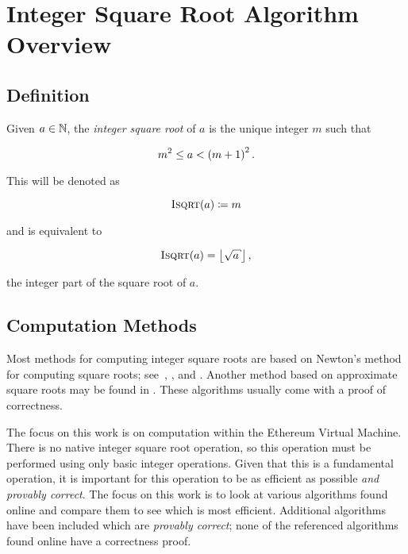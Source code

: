 \section{Integer Square Root Algorithm Overview}

\subsection{Definition}

Given $a\in\mathbb{N}$, the \emph{integer square root} of $a$
is the unique integer $m$ such that

\begin{equation}
    m^{2} \le a < \left( m+1 \right)^{2}.
\end{equation}

\noindent
This will be denoted as

\begin{equation}
    \textsc{Isqrt}( a ) \coloneqq{} m
\end{equation}

\noindent
and is equivalent to 

\begin{equation}
    \isqrt{a} = \floor{\sqrt{a}},
\end{equation}

\noindent
the integer part of the square root of $a$.

\subsection{Computation Methods}

Most methods for computing integer square roots are based
on Newton's method for computing square roots;
see~\cite[Algorithm 1.7.1]{cohen1993},
\cite[Algorithm 9.2.11]{PrimeNumbersACP2005},
and  \cite[Algorithm 1.13]{ModernComputerArithmetic051}.
Another method based on approximate square roots
may be found in \cite{PythonIsqrt}.
These algorithms usually come with a proof of correctness.

The focus on this work is on computation within the Ethereum Virtual Machine.
There is no native integer square root operation,
so this operation must be performed using only basic integer operations.
Given that this is a fundamental operation,
it is important for this operation to be as efficient as possible
\emph{and provably correct}.
The focus on this work is to look at various algorithms found online
and compare them to see which is most efficient.
Additional algorithms have been included which are \emph{provably correct};
none of the referenced algorithms found online have a correctness proof.
